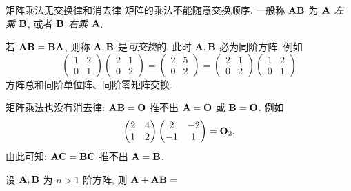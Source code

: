 \begin{frame}{矩阵乘法无交换律和消去律}
	\onslide<+->
	\alert{矩阵的乘法不能随意交换顺序}.
	\onslide<+->
	一般称 ${\mathbf{A}}{\mathbf{B}}$ 为 \emph{${\mathbf{A}}$ 左乘 ${\mathbf{B}}$}, 或者 \emph{${\mathbf{B}}$ 右乘 ${\mathbf{A}}$}.

	\onslide<+->
	若 ${\mathbf{A}}{\mathbf{B}}={\mathbf{B}}{\mathbf{A}}$, 则称 ${\mathbf{A}},{\mathbf{B}}$ 是\emph{可交换}的.
	\onslide<+->
	此时 ${\mathbf{A}},{\mathbf{B}}$ \alert{必为同阶方阵}.
	\onslide<+->
	例如
	\[\begin{pmatrix}
		1&2\\0&1
	\end{pmatrix}\begin{pmatrix}
		2&1\\0&2
	\end{pmatrix}=\begin{pmatrix}
		2&5\\0&2
	\end{pmatrix}=\begin{pmatrix}
		2&1\\0&2
	\end{pmatrix}\begin{pmatrix}
		1&2\\0&1
	\end{pmatrix}\]
	\onslide<+->
	方阵总和同阶单位阵、同阶零矩阵交换.

	\onslide<+->
	矩阵乘法也没有消去律: ${\mathbf{A}}{\mathbf{B}}={\mathbf{O}}$ 推不出 ${\mathbf{A}}={\mathbf{O}}$ 或 ${\mathbf{B}}={\mathbf{O}}$.
	\onslide<+->
	例如
	\[\begin{pmatrix}
		2&4\\1&2
	\end{pmatrix}\begin{pmatrix}
		2&-2\\-1&1
	\end{pmatrix}={\mathbf{O}}_2.\]
	\onslide<+->
	由此可知: ${\mathbf{A}}{\mathbf{C}}={\mathbf{B}}{\mathbf{C}}$ 推不出 ${\mathbf{A}}={\mathbf{B}}$. 

	\onslide<+->
	\begin{exercise}
		设 ${\mathbf{A}},{\mathbf{B}}$ 为 $n>1$ 阶方阵, 则 ${\mathbf{A}}+{\mathbf{A}}{\mathbf{B}}=$
	\end{exercise}
\end{frame}



